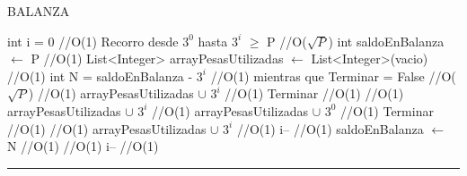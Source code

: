 

\begin{algorithm}[H]
\caption{BALANZA}
\begin{algorithmic}[1]
\state int i = 0 \hfill //O(1)
\state Recorro desde $3^0$ hasta $3^i$ $\geq$ P  \hfill //O($\sqrt{P}$)
\state int saldoEnBalanza  $\gets$ P \hfill //O(1)
\state List<Integer> arrayPesasUtilizadas $\gets$ List<Integer>(vacio) \hfill //O(1)
\state int N = saldoEnBalanza - $3^i$ \hfill //O(1)
\state mientras que Terminar = False \hfill //O($\sqrt{P}$)
 \hfill //O(1)
\state arrayPesasUtilizadas $\cup$ {$3^i$} \hfill //O(1)
\state Terminar \hfill //O(1)
\endif
{} \hfill //O(1)
\state arrayPesasUtilizadas $\cup$ {$3^i$} \hfill //O(1)
\state arrayPesasUtilizadas $\cup$ {$3^0$} \hfill //O(1)
\state Terminar \hfill //O(1)
\endif
{} \hfill //O(1)
\state arrayPesasUtilizadas $\cup$ {$3^i$} \hfill //O(1)
\state i-- \hfill //O(1)
\state saldoEnBalanza $\gets$ N \hfill //O(1)
\endif
{} \hfill //O(1)
\state i-- \hfill //O(1)
\endif
\EndFunction 
\end{algorithmic}
\hrule
{}
\end{algorithm}

